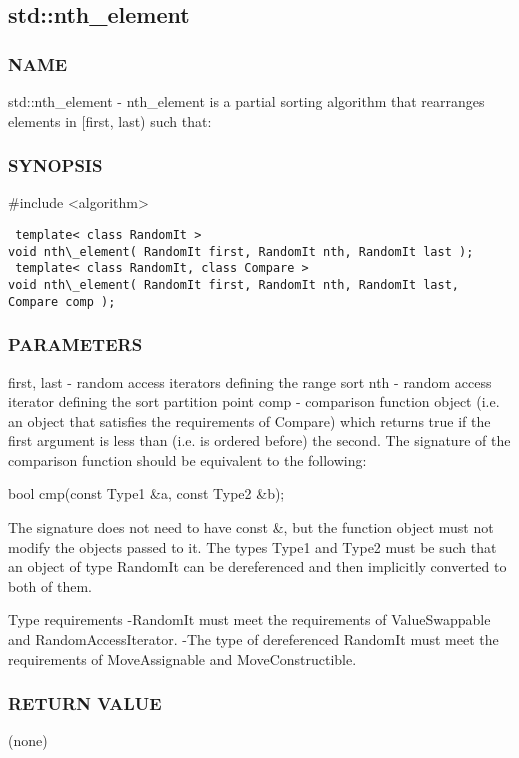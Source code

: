 \subsection{std::nth\_element}

\subsubsection{NAME}
std::nth\_element - nth\_element is a partial sorting algorithm that rearranges elements in [first, last) such that:

\subsubsection{SYNOPSIS}
\#include <algorithm>

\begin{lstlisting}
 template< class RandomIt >
void nth\_element( RandomIt first, RandomIt nth, RandomIt last );
 template< class RandomIt, class Compare >
void nth\_element( RandomIt first, RandomIt nth, RandomIt last, Compare comp );
\end{lstlisting}

\subsubsection{PARAMETERS}
first, last - random access iterators defining the range sort
nth - random access iterator defining the sort partition point
comp - comparison function object (i.e. an object that satisfies the requirements of Compare) which returns true if the first argument is less than (i.e. is ordered before) the second.
The signature of the comparison function should be equivalent to the following:

 bool cmp(const Type1 \&a, const Type2 \&b);

The signature does not need to have const \&, but the function object must not modify the objects passed to it.
The types Type1 and Type2 must be such that an object of type RandomIt can be dereferenced and then implicitly converted to both of them.

 Type requirements
 -RandomIt must meet the requirements of ValueSwappable and RandomAccessIterator.
 -The type of dereferenced RandomIt must meet the requirements of MoveAssignable and MoveConstructible.

\subsubsection{RETURN VALUE}
(none)



